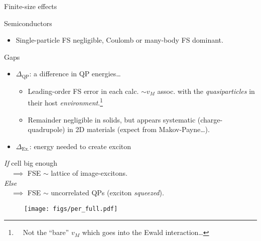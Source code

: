 \documentclass[10pt, pdf, hyperref={draft}, usenames, dvipsnames]{beamer}
\begin{document}
\begin{frame}{Finite-size effects}
\begin{block}{Semiconductors}
\begin{itemize}
  \item Single-particle FS negligible, Coulomb or many-body FS
  dominant.
\end{itemize}
\end{block}
\begin{block}{Gaps}
  \begin{itemize}
    \item $\Delta_{\text{QP}}$: a difference in QP energies\ldots
    \begin{itemize}
      \item Leading-order FS error in each calc. $\sim v_M$ assoc. with
      the \textit{quasiparticles} in their host
      \textit{environment}.\footnote{~~Not the ``bare'' $v_M$ which goes into the
      Ewald interaction\ldots}
      \item Remainder negligible in solids, but appears systematic
      (charge-quadrupole) in 2D materials (expect from
      Makov-Payne\ldots{}).
    \end{itemize}
  \end{itemize}
\end{block}

\begin{minipage}[t]{0.65\textwidth}
\begin{itemize}
  \item $\Delta_{\text{Ex.}}$: energy needed to create exciton
\end{itemize}

\textit{If} cell big enough \\
\ \ $\implies$ FSE $\sim$ lattice of image-excitons.\\
\textit{Else} \\
\ \ $\implies$ FSE $\sim$ uncorrelated QPs (exciton \textit{squeezed}).


\end{minipage}%
\hfill
\begin{minipage}[t]{0.35\textwidth}

\begin{figure}[H]
  \centering
  \texttt{[image: figs/per\_full.pdf]}
\end{figure}

\end{minipage}%

\end{frame}
\end{document}
